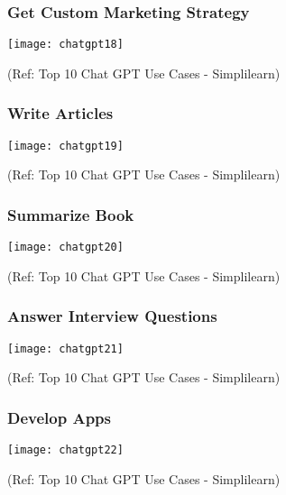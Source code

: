 \begin{frame}[fragile]\frametitle{Get Custom Marketing Strategy}
\begin{center}
\texttt{[image: chatgpt18]}
\end{center}

{\tiny (Ref: Top 10 Chat GPT Use Cases - Simplilearn)}
\end{frame}

\begin{frame}[fragile]\frametitle{Write Articles}
\begin{center}
\texttt{[image: chatgpt19]}
\end{center}

{\tiny (Ref: Top 10 Chat GPT Use Cases - Simplilearn)}
\end{frame}

\begin{frame}[fragile]\frametitle{Summarize Book}
\begin{center}
\texttt{[image: chatgpt20]}
\end{center}

{\tiny (Ref: Top 10 Chat GPT Use Cases - Simplilearn)}
\end{frame}

\begin{frame}[fragile]\frametitle{Answer Interview Questions}
\begin{center}
\texttt{[image: chatgpt21]}
\end{center}

{\tiny (Ref: Top 10 Chat GPT Use Cases - Simplilearn)}
\end{frame}

\begin{frame}[fragile]\frametitle{Develop Apps}
\begin{center}
\texttt{[image: chatgpt22]}
\end{center}

{\tiny (Ref: Top 10 Chat GPT Use Cases - Simplilearn)}
\end{frame}

